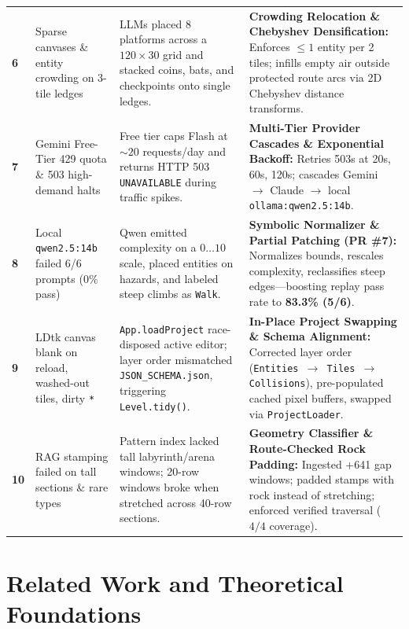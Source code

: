 \documentclass[11pt,a4paper]{report}
\theoremstyle{definition}
\theoremstyle{remark}
\begin{document}
\begin{table}[htbp]
\begin{tabularx}{\textwidth}{l p{3.2cm} p{4.2cm} X}
\addlinespace
\textbf{6} & Sparse canvases \& entity crowding on 3-tile ledges & LLMs placed 8 platforms across a $120\times 30$ grid and stacked coins, bats, and checkpoints onto single ledges. & \textbf{Crowding Relocation \& Chebyshev Densification:} Enforces $\le 1$ entity per 2 tiles; infills empty air outside protected route arcs via 2D Chebyshev distance transforms. \\
\addlinespace
\textbf{7} & Gemini Free-Tier 429 quota \& 503 high-demand halts & Free tier caps Flash at $\sim 20$ requests/day and returns HTTP 503 \texttt{UNAVAILABLE} during traffic spikes. & \textbf{Multi-Tier Provider Cascades \& Exponential Backoff:} Retries 503s at 20s, 60s, 120s; cascades Gemini $\to$ Claude $\to$ local \texttt{ollama:qwen2.5:14b}. \\
\addlinespace
\textbf{8} & Local \texttt{qwen2.5:14b} failed 6/6 prompts (0\% pass) & Qwen emitted complexity on a $0\dots 10$ scale, placed entities on hazards, and labeled steep climbs as \texttt{Walk}. & \textbf{Symbolic Normalizer \& Partial Patching (PR \#7):} Normalizes bounds, rescales complexity, reclassifies steep edges---boosting replay pass rate to \textbf{83.3\% (5/6)}. \\
\addlinespace
\textbf{9} & LDtk canvas blank on reload, washed-out tiles, dirty \texttt{*} & \texttt{App.loadProject} race-disposed active editor; layer order mismatched \texttt{JSON\_SCHEMA.json}, triggering \texttt{Level.tidy()}. & \textbf{In-Place Project Swapping \& Schema Alignment:} Corrected layer order (\texttt{Entities $\to$ Tiles $\to$ Collisions}), pre-populated cached pixel buffers, swapped via \texttt{ProjectLoader}. \\
\addlinespace
\textbf{10} & RAG stamping failed on tall sections \& rare types & Pattern index lacked tall labyrinth/arena windows; 20-row windows broke when stretched across 40-row sections. & \textbf{Geometry Classifier \& Route-Checked Rock Padding:} Ingested +641 gap windows; padded stamps with rock instead of stretching; enforced verified traversal ($4/4$ coverage). \\
\bottomrule
\end{tabularx}
\end{table}

\chapter{Related Work and Theoretical Foundations}
\label{chap:related}
\end{document}
